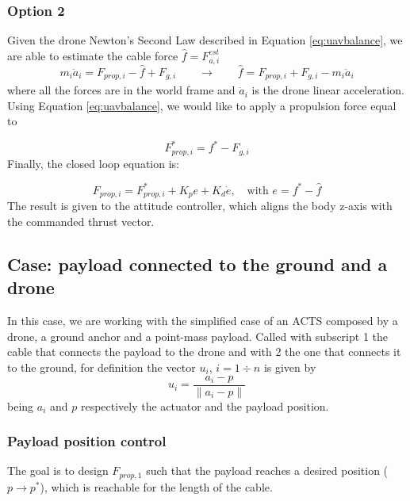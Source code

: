 \subsubsection{Option 2}
Given the drone Newton's Second Law described in Equation \ref{eq:uavbalance}, we are able to estimate the cable force $\hat{f} = F_{a, i}^{est}$
\begin{equation}
    m_i \ddot{a}_i = F_{prop, i} - \hat{f} + F_{g, i} \qquad \xrightarrow[]{} \qquad \hat{f} = F_{prop, i} + F_{g, i} - m_i \ddot{a}_i
    \label{eq:uavNewton2law}
\end{equation}
where all the forces are in the world frame and $\ddot{a}_i$ is the drone linear acceleration. Using Equation \ref{eq:uavbalance}, we would like to apply a propulsion force equal to 

\begin{equation}    
    F_{prop, i}^* = f^* - F_{g, i}
\end{equation}
Finally, the closed loop equation is:

\begin{equation}
    F_{prop, i} = F_{prop, i}^* + K_p e + K_d \dot{e}
    , \quad \text{with } e = f^* - \hat{f}
\end{equation}
The result is given to the attitude controller, which aligns the body z-axis with the commanded thrust vector.

\subsection{Case: payload connected to the ground and a drone}
In this case, we are working with the simplified case of an ACTS composed by a drone, a ground anchor and a point-mass payload. Called with subscript 1 the cable that connects the payload to the drone and with 2 the one that connects it to the ground, for definition the vector $u_i$, $i = 1\div n$ is given by 
  \begin{equation}
    u_i = \frac{a_i-p}{\|a_i-p\|}
  \end{equation}
being $a_i$ and $p$ respectively the actuator and the payload position.

\subsubsection{Payload position control}
The goal is to design $F_{prop, 1}$ such that the payload reaches a desired position ($p \xrightarrow{}p^*$), which is reachable for the length of the cable.

